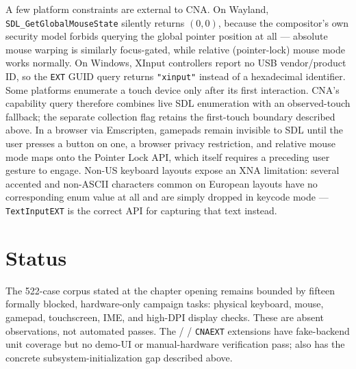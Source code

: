 A few platform constraints are external to CNA. On Wayland,
\texttt{SDL\_GetGlobalMouseState} silently returns $(0,0)$, because the compositor's own
security model forbids querying the global pointer position at all --- absolute mouse
warping is similarly focus-gated, while relative (pointer-lock) mouse mode works normally.
On Windows, XInput controllers report no USB vendor/product ID, so the \texttt{EXT}
GUID query returns \texttt{"xinput"} instead of a hexadecimal identifier.
Some platforms enumerate a touch device only after its first interaction. CNA's capability query
therefore combines live SDL enumeration with an observed-touch fallback; the separate collection
flag retains the first-touch boundary described above. In a browser via Emscripten, gamepads
remain invisible to SDL until the user
presses a button on one, a browser privacy restriction, and relative mouse mode maps onto the
Pointer Lock API, which itself requires a preceding user gesture to engage. Non-US keyboard
layouts expose an XNA limitation: several
accented and non-ASCII characters common on European layouts have no corresponding
 enum value at all and are simply dropped in keycode mode --- \texttt{TextInputEXT}
is the correct API for capturing that text instead.

\section{Status}

The 522-case corpus stated at the chapter opening remains bounded by fifteen formally blocked,
hardware-only campaign tasks: physical keyboard, mouse, gamepad, touchscreen, IME, and high-DPI
display checks. These are absent observations, not automated passes. The  /
 / 
\texttt{CNAEXT} extensions have fake-backend unit coverage but no demo-UI or manual-hardware
verification pass;  also has the concrete subsystem-initialization gap
described above.
